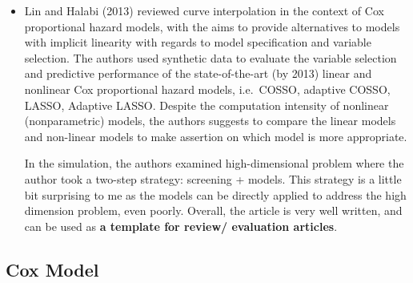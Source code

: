\documentclass{article}
\begin{document}
\begin{itemize}
\item
  Lin and Halabi (2013) reviewed curve interpolation in the context of
  Cox proportional hazard models, with the aims to provide alternatives
  to models with implicit linearity with regards to model specification
  and variable selection. The authors used synthetic data to evaluate
  the variable selection and predictive performance of the
  state-of-the-art (by 2013) linear and nonlinear Cox proportional
  hazard models, i.e.~COSSO, adaptive COSSO, LASSO, Adaptive LASSO.
  Despite the computation intensity of nonlinear (nonparametric) models,
  the authors suggests to compare the linear models and non-linear
  models to make assertion on which model is more appropriate.

  In the simulation, the authors examined high-dimensional problem where
  the author took a two-step strategy: screening + models. This strategy
  is a little bit surprising to me as the models can be directly applied
  to address the high dimension problem, even poorly. Overall, the
  article is very well written, and can be used as \textbf{a template
  for review/ evaluation articles}.
\end{itemize}

\hypertarget{cox-model}{%
\subsection{Cox Model}\label{cox-model}}
\end{document}
